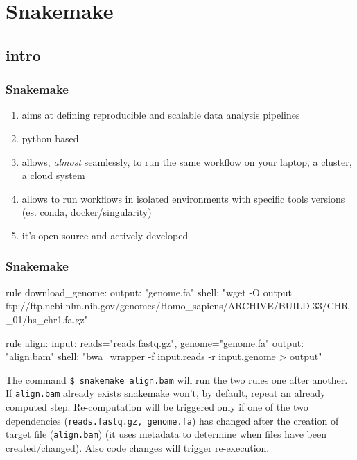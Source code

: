 \documentclass[xcolor=table]{beamer}
\begin{document}
\section{Snakemake}
\subsection{intro}
\begin{frame}[fragile]
\frametitle{Snakemake}
\begin{beamerboxesrounded}[upper=upper_box2,lower=lower_box,shadow=true]{}
\begin{enumerate}
\item aims at defining \textcolor{novak}{reproducible} and \textcolor{galon}{scalable} data analysis pipelines
\item python based 
\item allows, \emph{almost} seamlessly, to run the same workflow on your laptop, a cluster, a cloud system
\item allows to run workflows in isolated environments with specific tools versions (es. \textcolor{novak}{conda, docker/singularity})
\item it's \textcolor{beer}{open source} and actively developed
\end{enumerate}
\end{beamerboxesrounded}
\end{frame}


\begin{frame}[fragile]
\frametitle{Snakemake}
\begin{python}
rule download_genome:
	output: "genome.fa"
	shell: "wget -O {output} ftp://ftp.ncbi.nlm.nih.gov/genomes/Homo_sapiens/ARCHIVE/BUILD.33/CHR_01/hs_chr1.fa.gz"

rule align:
	input: reads="reads.fastq.gz", genome="genome.fa"
	output: "align.bam"
	shell: "bwa_wrapper -f {input.reads} -r {input.genome} > {output}"
\end{python}

\tiny{
The command \texttt{\$ snakemake align.bam} will run the two rules one after another.\\
If \texttt{align.bam} already exists snakemake won't, by default, repeat an already computed step. Re-computation will
be triggered only if one of the two \textcolor{galon}{dependencies} (\texttt{reads.fastq.gz, genome.fa}) has changed after the creation of \textcolor{novak}{target} file (\texttt{align.bam}) (it uses
metadata to determine when files have been created/changed). Also \textcolor{galon}{code changes} will trigger re-execution.
}
\end{frame}
\end{document}
